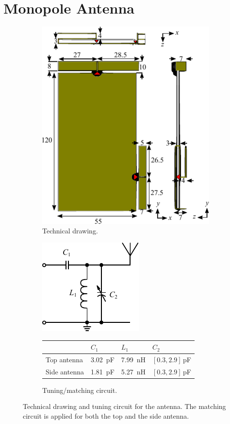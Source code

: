 \section{Monopole Antenna}
\label{sec:techsol1_monopole}

\begin{figure}[htbp]
    \begin{subfigure}[b]{0.49\linewidth}
        \centering
        \includegraphics{img/tech_sol/monopole/tech_drawing}
        \caption{Technical drawing.}
        \label{fig:ant1technical}
    \end{subfigure}
    \hfill
    \begin{subfigure}[b]{0.49\linewidth}
        \centering
        \includegraphics{img/tech_sol/schematic_tuning_1}\\[1cm]
\footnotesize
        \begin{tabular}{|l|l|l|l|}
            \hline
            & $C_1$ & $L_1$ & $C_2$ \\
            \hline
            Top antenna & \SI{3.02}{pF} & \SI{7.99}{nH} & $[0.3,2.9]\,$pF\\
            Side antenna & \SI{1.81}{pF} & \SI{5.27}{nH} & $[0.3,2.9]\,$pF\\
            \hline
        \end{tabular}
        \caption{Tuning/matching circuit.}
    \end{subfigure}
    \caption{Technical drawing and tuning circuit for the antenna.  The matching circuit is applied for both the top and the side antenna.}
    \label{fig:ant1techschem}
\end{figure}

